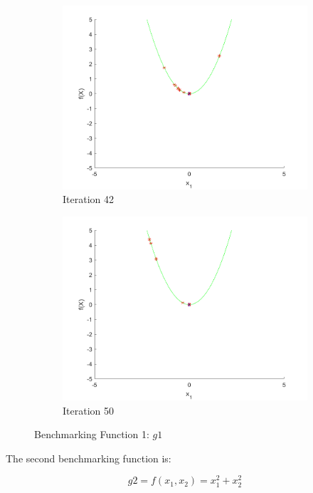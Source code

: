 \begin{figure}
\begin{subfigure}[b]{0.4\textwidth}
    \includegraphics[width=\textwidth]{img/smpl/circ/loa-iter-42}
    \caption{Iteration 42}
    \label{fig:s1-iter-6}
  \end{subfigure}
  \begin{subfigure}[b]{0.4\textwidth}
    \includegraphics[width=\textwidth]{img/smpl/circ/loa-iter-50}
    \caption{Iteration 50}
    \label{fig:s1-iter-7}
  \end{subfigure}
  \caption{Benchmarking Function 1: $g1$}
\end{figure}

\par The second benchmarking function is:

$$
  g2=f(x_1, x_2) = x_1^2 + x_2^2
$$

